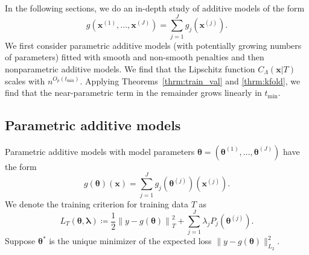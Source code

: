 \documentclass[12pt]{article} %
\theoremstyle{definition}
\begin{document}

In the following sections, we do an in-depth study of additive models of the form
\begin{equation}
g(\boldsymbol{x}^{(1)}, ..., \boldsymbol{x}^{(J)})= \sum_{j=1}^J g_j(\boldsymbol{x}^{(j)}).
\end{equation}
We first consider parametric additive models (with potentially growing numbers of parameters) fitted with smooth and non-smooth penalties and then nonparametric additive models.
We find that the Lipschitz function $C_\Lambda(\boldsymbol{x} | T)$ scales with $n^{O_p(t_{\min})}$.
Applying Theorems~\ref{thrm:train_val} and \ref{thrm:kfold}, we find that the near-parametric term in the remainder grows linearly in $t_{\min}$.

\subsection{Parametric additive models}
\label{sec:param_add_models}
Parametric additive models with model parameters $\boldsymbol{\theta} = \left (\boldsymbol{\theta}^{(1)}, ..., \boldsymbol{\theta}^{(J)} \right )$ have the form
\begin{equation}
g(\boldsymbol{\theta})(\boldsymbol{x})
= \sum_{j=1}^J g_j(\boldsymbol{\theta}^{(j)})(\boldsymbol{x}^{(j)}).
\end{equation}
We denote the training criterion for training data $T$ as
\begin{equation}
\label{eq:param_add}
L_T \left (\boldsymbol{\theta}, \boldsymbol{\lambda} \right) 
\coloneqq \frac{1}{2} \left  \| y -  g(\boldsymbol{\theta}) \right \|^2_T 
+ \sum_{j=1}^J \lambda_j P_j(\boldsymbol{\theta}^{(j)}).
\end{equation}
Suppose $\boldsymbol{\theta}^*$ is the unique minimizer of the expected loss $\| y - g(\boldsymbol{\theta}) \|^2_{L_2}$.
\end{document}

